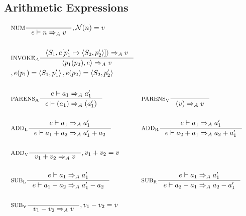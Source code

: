 \subsection{Arithmetic Expressions}
\newcommand{\Twedge}{\mathbin{^\wedge{}}}

\begin{align*}
&\inference[NUM]{}
                  {e \vdash n \Rightarrow_A v}
									{, \mathcal{N}(n) = v}
\\\\
&\inference[$\text{INVOKE}_A$]{\Braket{S_1,e[p_1' \mapsto \Braket{S_2,p_2'}]} \Rightarrow_A v}
                  {\Braket{p_1(p_2),e} \Rightarrow_A v}
\\									
&									{,e(p_1) = \Braket{S_1,p_1'}, e(p_2) = \Braket{S_2,p_2'}}
\\\\
&\inference[$\text{PARENS}_\text{A}$]{e \vdash a_1 \Rightarrow_A a_1'}
                       {e \vdash (a_1) \Rightarrow_A (a_1')}
&
&\inference[$\text{PARENS}_\text{V}$]{}
                       {(v) \Rightarrow_A v}
\\\\
&\inference[$\text{ADD}_\text{L}$]{e \vdash a_1 \Rightarrow_A a_1'}
                    {e \vdash  a_1 + a_2 \Rightarrow_A a_1' + a_2}
&
&\inference[$\text{ADD}_\text{R}$]{e \vdash a_1 \Rightarrow_A a_1'}
										{e \vdash a_2 + a_1 \Rightarrow_A a_2 + a_1'}
\\\\
&\inference[$\text{ADD}_\text{V}$]{}
                    {v_1 + v_2 \Rightarrow_A v}
										{, v_1 + v_2 = v}
\\\\
&\inference[$\text{SUB}_\text{L}$]{e \vdash a_1 \Rightarrow_A a_1'}
                    {e \vdash a_1 - a_2 \Rightarrow_A a_1' - a_2}
&
&\inference[$\text{SUB}_\text{R}$]{e \vdash a_1 \Rightarrow_A a_1'}
                    {e \vdash a_2 - a_1 \Rightarrow_A a_2 - a_1'}
\\\\
&\inference[$\text{SUB}_\text{V}$]{}
                    {v_1 - v_2 \Rightarrow_A v}
										{, v_1 - v_2 = v}
\end{align*}
